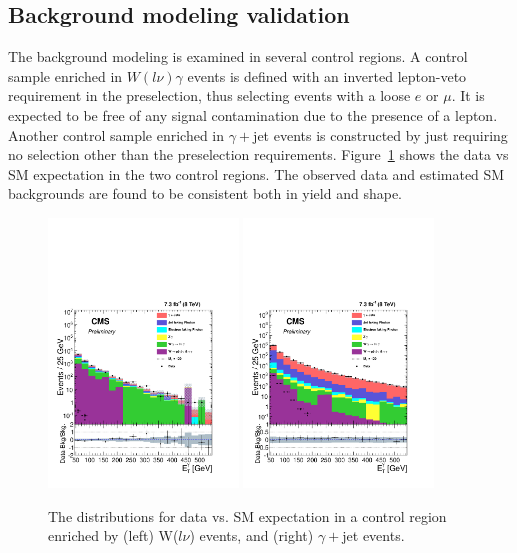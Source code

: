 \subsection{Background modeling validation}

The background modeling is examined in several control regions. A control sample enriched in $W(l\nu)\gamma$ events is defined with an inverted lepton-veto requirement in the preselection, thus selecting events with a loose $e$ or $\mu$. It is expected to be free of any signal contamination due to the presence of a lepton. Another control sample enriched in $\gamma +$jet events is constructed by just requiring no selection other than the preselection requirements. Figure~\ref{fig:CR12} shows the data vs SM expectation in the two control regions. The observed data and estimated SM backgrounds are found to be consistent both in yield and shape.

\begin{figure}[H]                  
\centering   
{\label{fig:QCDPt}\includegraphics[width=0.45\textwidth]{PAS_Plots2/StackedHisto_Pho_Pt_LeptonCR.pdf}}
{\label{fig:QCDMET}\includegraphics[width=0.45\textwidth]{PAS_Plots2/StackedHisto_Pho_Pt_Preliminary.pdf}}
\caption{The \etg distributions for data vs. SM expectation in a control region enriched by (left) W($l\nu$) events, and (right) $\gamma+$jet events.}
\label{fig:CR12}                     
\end{figure} 

  
